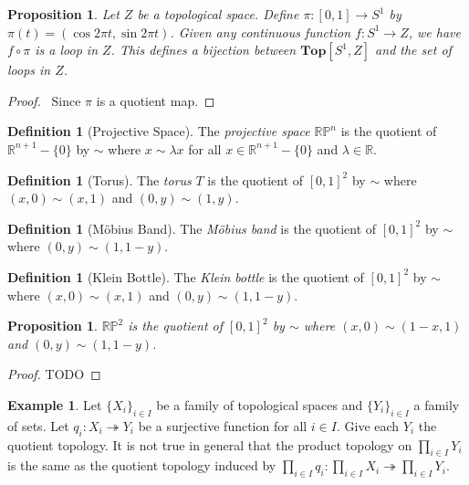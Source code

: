 \documentclass{book}
\let\qed\relax
\newtheorem{prop}[ax]{Proposition}
\theoremstyle{definition}
\newtheorem{df}[ax]{Definition}
\newtheorem{ex}[ax]{Example}
\newcommand{\Top}{\ensuremath{\mathbf{Top}}}
\begin{document}
\begin{prop}
Let $Z$ be a topological space. Define $\pi : [0,1] \rightarrow S^1$ by $\pi(t) = (\cos 2 \pi t, \sin 2 \pi t)$. Given any continuous function $f : S^1 \rightarrow Z$, we have $f \circ \pi$ is a loop in $Z$. This defines a bijection between $\Top[S^1,Z]$ and the set of loops in $Z$.
\end{prop}

\begin{proof}
\pf\ Since $\pi$ is a quotient map. \qed
\end{proof}

\begin{df}[Projective Space]
The \emph{projective space} $\mathbb{RP}^n$ is the quotient of $\mathbb{R}^{n+1} - \{0\}$ by $\sim$ where $x \sim \lambda x$ for all $x \in \mathbb{R}^{n+1} - \{0\}$ and $\lambda \in \mathbb{R}$.
\end{df}

\begin{df}[Torus]
The \emph{torus} $T$ is the quotient of $[0,1]^2$ by $\sim$ where $(x,0) \sim (x,1)$ and $(0,y) \sim (1,y)$.
\end{df}

\begin{df}[M\"{o}bius Band]
The \emph{M\"{o}bius band} is the quotient of $[0,1]^2$ by $\sim$ where $(0,y) \sim (1,1-y)$.
\end{df}

\begin{df}[Klein Bottle]
The \emph{Klein bottle} is the quotient of $[0,1]^2$ by $\sim$ where $(x,0) \sim (x,1)$ and $(0,y) \sim (1,1-y)$.
\end{df}

\begin{prop}
$\mathbb{RP}^2$ is the quotient of $[0,1]^2$ by $\sim$ where $(x,0) \sim (1-x,1)$ and $(0,y) \sim (1,1-y)$.
\end{prop}

\begin{proof}
\pf TODO
\end{proof}

\begin{ex}
Let $\{X_i\}_{i \in I}$ be a family of topological spaces and $\{Y_i\}_{i \in I}$ a family of sets. Let $q_i : X_i \twoheadrightarrow Y_i$ be a surjective function for all $i \in I$. Give each $Y_i$ the quotient topology. It is not true in general that the product topology on $\prod_{i \in I} Y_i$ is the same as the quotient topology induced by $\prod_{i \in I} q_i : \prod_{i \in I} X_i \twoheadrightarrow \prod_{i \in I} Y_i$.
\end{ex}
\end{document}
